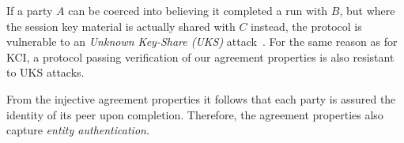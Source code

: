 
If a party $A$ can be coerced into believing it completed a run with $B$, but
where the session key material is actually shared with $C$ instead, the 
protocol is vulnerable to an \emph{Unknown Key-Share (UKS)}
attack~\cite{DBLP:conf/ima/Blake-WilsonJM97}.
%
For the same reason as for KCI, a protocol passing verification of our agreement
properties is also resistant to UKS attacks.
%

From the injective agreement properties it follows that each party is assured
the identity of its peer upon completion.
%
Therefore, the agreement properties also capture \emph{entity authentication}.
%


